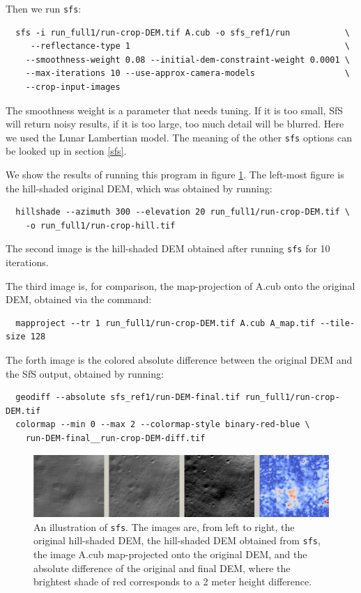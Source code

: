 Then we run \texttt{sfs}:
\begin{verbatim}
  sfs -i run_full1/run-crop-DEM.tif A.cub -o sfs_ref1/run           \
     --reflectance-type 1                                           \
    --smoothness-weight 0.08 --initial-dem-constraint-weight 0.0001 \
    --max-iterations 10 --use-approx-camera-models                  \
    --crop-input-images
\end{verbatim}

The smoothness weight is a parameter that needs tuning. If it is too
small, SfS will return noisy results, if it is too large, too much
detail will be blurred. Here we used the Lunar Lambertian model. The
meaning of the other \texttt{sfs} options can be looked up in section
\ref{sfs}.

We show the results of running this program in figure
\ref{fig:sfs1}. The left-most figure is the hill-shaded original DEM,
which was obtained by running:
\begin{verbatim}
  hillshade --azimuth 300 --elevation 20 run_full1/run-crop-DEM.tif \
    -o run_full1/run-crop-hill.tif 
\end{verbatim}
The second image is the hill-shaded DEM obtained after running
\texttt{sfs} for 10 iterations.

The third image is, for comparison, the map-projection of A.cub onto the
original DEM, obtained via the command:
\begin{verbatim}
  mapproject --tr 1 run_full1/run-crop-DEM.tif A.cub A_map.tif --tile-size 128
\end{verbatim}
The forth image is the colored absolute difference between the original
DEM and the SfS output, obtained by running:
\begin{verbatim}
  geodiff --absolute sfs_ref1/run-DEM-final.tif run_full1/run-crop-DEM.tif
  colormap --min 0 --max 2 --colormap-style binary-red-blue \
    run-DEM-final__run-crop-DEM-diff.tif
\end{verbatim}
\begin{figure}[h!]
  \begin{center}
    \includegraphics[width=7in]{images/sfs1.jpg}
    \caption[sfs]{An illustration of \texttt{sfs}. The images are, from
      left to right, the original hill-shaded DEM, the hill-shaded DEM obtained
      from \texttt{sfs}, the image A.cub map-projected onto the original DEM,
      and the absolute difference of the original and final DEM, where the brightest
      shade of red corresponds to a 2 meter height difference.}
    \label{fig:sfs1}
  \end{center}
\end{figure}

